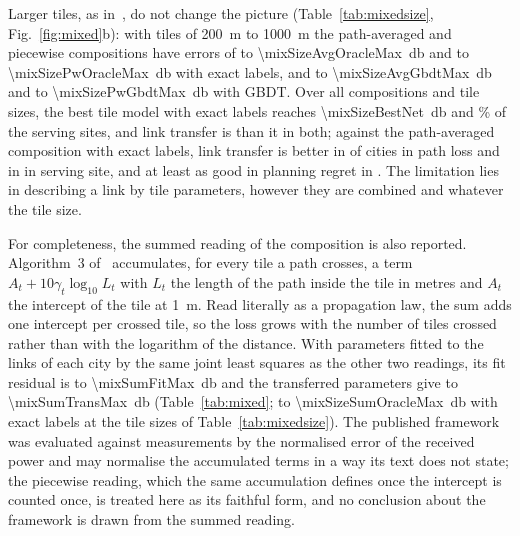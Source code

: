 Larger tiles, as in~\cite{ozyurt2026}, do not change the picture
(Table~\ref{tab:mixedsize}, Fig.~\ref{fig:mixed}b): with tiles of
\SI{200}{\metre} to \SI{1000}{\metre} the path-averaged and piecewise
compositions have errors of \mixSizeAvgOracleMin{} to
\SI{\mixSizeAvgOracleMax}{\decibel} and \mixSizePwOracleMin{} to
\SI{\mixSizePwOracleMax}{\decibel} with exact labels, and
\mixSizeAvgGbdtMin{} to \SI{\mixSizeAvgGbdtMax}{\decibel} and
\mixSizePwGbdtMin{} to \SI{\mixSizePwGbdtMax}{\decibel} with GBDT. Over
all compositions and tile sizes, the best tile model with exact labels
reaches \SI{\mixSizeBestNet}{\decibel} and \mixSizeBestAssoc\% of the
serving sites, and link transfer is \mixSizeLinkBetterBest{} than it in
both; against the path-averaged composition with exact labels, link
transfer is better in \mixAvgLinkBetterPl{} of \nFolds{} cities in path
loss and in \mixAvgLinkBetterAssoc{} in serving site, and at least as good
in planning regret in \mixAvgLinkBetterRegret. The limitation lies in
describing a link by tile parameters, however they are combined and
whatever the tile size.

For completeness, the summed reading of the composition is also reported.
Algorithm~3 of~\cite{ozyurt2026} accumulates, for every tile a path
crosses, a term $A_t+10\gamma_t\log_{10}L_t$ with $L_t$ the length of the
path inside the tile in metres and $A_t$ the intercept of the tile at
\SI{1}{\metre}. Read literally as a propagation law, the sum adds one
intercept per crossed tile, so the loss grows with the number of tiles
crossed rather than with the logarithm of the distance. With parameters
fitted to the links of each city by the same joint least squares as the
other two readings, its fit residual is \mixSumFitMin{} to
\SI{\mixSumFitMax}{\decibel} and the transferred parameters give
\mixSumTransMin{} to \SI{\mixSumTransMax}{\decibel} (Table~\ref{tab:mixed};
\mixSizeSumOracleMin{} to \SI{\mixSizeSumOracleMax}{\decibel} with exact
labels at the tile sizes of Table~\ref{tab:mixedsize}). The published
framework was evaluated against measurements by the normalised error of the
received power and may normalise the accumulated terms in a way its text
does not state; the piecewise reading, which the same accumulation defines
once the intercept is counted once, is treated here as its faithful form,
and no conclusion about the framework is drawn from the summed reading.

\begin{table}[!tp]
\centering
\caption{Receiver-tile and mixed-path compositions of the tile model, and
link transfer, on the held-out cities (mean over cities). Tile labels:
fitted to the links of the held-out city itself; median, kernel and GBDT:
transferred from the training cities. PL: path-loss RMSE; serv.:
serving-site accuracy; SINR: mean absolute error; edge: cell-edge
displacement; regret: $K=5$.}
\label{tab:mixed}
\footnotesize\setlength{\tabcolsep}{3pt}
%
\end{table}

